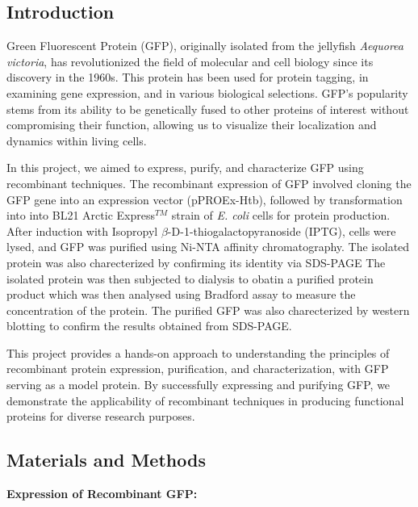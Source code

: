 \documentclass[twoside]{article}
\begin{document}
\begin{multicols}{2}

\subsection*{Introduction}
Green Fluorescent Protein (GFP), originally isolated from the jellyfish \textit{Aequorea victoria}, has revolutionized the field of 
molecular and cell biology since its discovery in the 1960s. This protein has been used for protein tagging,
in examining gene expression, and in various biological selections. GFP's popularity stems from its ability to be 
genetically fused to other proteins of interest without compromising their function, allowing us to 
visualize their localization and dynamics within living cells.

In this project, we aimed to express, purify, and characterize GFP using recombinant techniques. 
The recombinant expression of GFP involved cloning the GFP gene into an expression vector (pPROEx-Htb), followed by 
transformation into into BL21 Arctic Express$^{TM}$ strain of \textit{E. coli} cells for protein production. After induction with Isopropyl 
$\beta$-D-1-thiogalactopyranoside (IPTG), cells were lysed, and GFP was purified using Ni-NTA affinity chromatography. 
The isolated protein was also charecterized by confirming its identity via SDS-PAGE
The isolated protein was then subjected to dialysis to obatin a purified protein product which was then analysed using 
Bradford assay to measure the concentration of the protein.
The purified GFP was also charecterized by western blotting to confirm the results obtained from SDS-PAGE.

This project provides a hands-on approach to understanding the principles of recombinant protein expression, 
purification, and characterization, with GFP serving as a model protein. By successfully expressing and 
purifying GFP, we demonstrate the applicability of recombinant techniques in producing functional 
proteins for diverse research purposes.


\subsection*{Materials and Methods}

\textbf{Expression of Recombinant GFP:}



\end{multicols}
\end{document}
